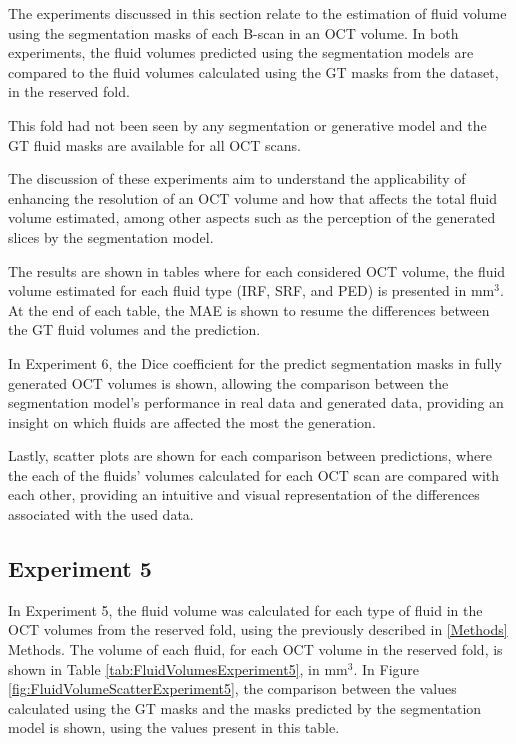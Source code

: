 The experiments discussed in this section relate to the estimation of fluid volume using the segmentation masks of each B-scan in an OCT volume. In both experiments, the fluid volumes predicted using the segmentation models are compared to the fluid volumes calculated using the GT masks from the dataset, in the reserved fold. 
\par
This fold had not been seen by any segmentation or generative model and the GT fluid masks are available for all OCT scans.
\par
The discussion of these experiments aim to understand the applicability of enhancing the resolution of an OCT volume and how that affects the total fluid volume estimated, among other aspects such as the perception of the generated slices by the segmentation model.
\par
The results are shown in tables where for each considered OCT volume, the fluid volume estimated for each fluid type (IRF, SRF, and PED) is presented in mm$^{3}$. At the end of each table, the MAE is shown to resume the differences between the GT fluid volumes and the prediction.
\par
In Experiment 6, the Dice coefficient for the predict segmentation masks in fully generated OCT volumes is shown, allowing the comparison between the segmentation model's performance in real data and generated data, providing an insight on which fluids are affected the most the generation.
\par
Lastly, scatter plots are shown for each comparison between predictions, where the each of the fluids' volumes calculated for each OCT scan are compared with each other, providing an intuitive and visual representation of the differences associated with the used data.

\subsection{Experiment 5}
In Experiment 5, the fluid volume was calculated for each type of fluid in the OCT volumes from the reserved fold, using the previously described in \ref{Methods} Methods. The volume of each fluid, for each OCT volume in the reserved fold, is shown in Table \ref{tab:FluidVolumesExperiment5}, in mm$^{3}$. In Figure \ref{fig:FluidVolumeScatterExperiment5}, the comparison between the values calculated using the GT masks and the masks predicted by the segmentation model is shown, using the values present in this table.

